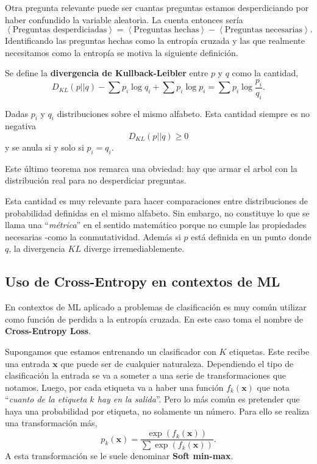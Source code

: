 Otra pregunta relevante puede ser cuantas preguntas estamos desperdiciando por haber confundido la variable aleatoria. La cuenta entonces ser\'ia
$$
    \left\langle \text{Preguntas desperdiciadas}\right\rangle = 
    \left\langle \text{Preguntas hechas}\right\rangle
    -
    \left\langle \text{Preguntas necesarias}\right\rangle.
$$
Identificando las preguntas hechas como la entrop\'ia cruzada y las que realmente necesitamos como la entrop\'ia se motiva la siguiente definici\'on.
\begin{definition}
    Se define la {\bf divergencia de Kullback-Leibler} entre $p$ y $q$ como la cantidad,
    \begin{equation}
        D_{KL}(p||q)-\sum p_i \log q_i + \sum p_i\log p_i =  \sum p_i\log\frac{p_i}{q_i}.
    \end{equation}
\end{definition}
\begin{theorem}
    Dadas $p_i$ y $q_i$ distribuciones sobre el mismo alfabeto. Esta cantidad siempre es no negativa
        \begin{equation}
            D_{KL}(p||q) \geq 0
        \end{equation}
    y se anula si y solo si $p_i=q_i$.
\end{theorem}

Este \'ultimo teorema nos remarca una obviedad: hay que armar el arbol con la distribuci\'on real para no desperdiciar preguntas.

Esta cantidad es muy relevante para hacer comparaciones entre distribuciones de probabilidad definidas en el mismo alfabeto. Sin embargo, no constituye lo que se llama una ``{\it m\'etrica}'' en el sentido matem\'atico porque no cumple las propiedades necesarias -como la conmutatividad. Adem\'as si $p$ est\'a definida en un punto donde $q$, la divergencia $KL$ diverge irremediablemente.


\subsection{Uso de Cross-Entropy en contextos de ML}
En contextos de ML aplicado a problemas de clasificaci\'on es muy com\'un utilizar como funci\'on de perdida a la entrop\'ia cruzada. En este caso toma el nombre de {\bf Cross-Entropy Loss}. 

Supongamos que estamos entrenando un clasificador con $K$ etiquetas. Este recibe una entrada $\mathbf{x}$ que puede ser de cualquier naturaleza. Dependiendo el tipo de clasificaci\'on la entrada se va a someter a una serie de transformaciones que notamos. Luego, por cada etiqueta va a haber una funci\'on $f_k(\mathbf{x})$ que nota ``{\it cuanto de la etiqueta $k$ hay en la salida}''. Pero lo m\'as com\'un es pretender que haya una probabilidad por etiqueta, no solamente un n\'umero. Para ello se realiza una transformaci\'on m\'as,
\begin{equation}
    p_k(\mathbf{x}) = \frac{\exp(f_k(\mathbf{x}))}{\sum \exp(f_k(\mathbf{x}))}.
    \label{3:eq:softminmax}
\end{equation}
A esta transformaci\'on se le suele denominar {\bf Soft min-max}.

